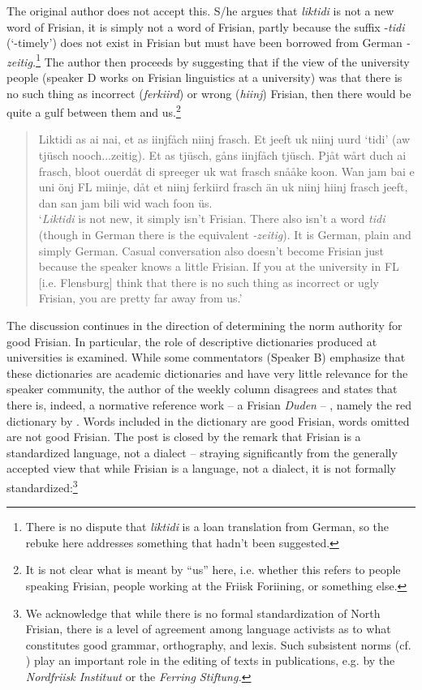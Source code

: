 \documentclass[output=paper]{langsci/langscibook}
\begin{document}
The original author does not accept this. S/he argues that \textit{liktidi} is not a new word of Frisian, it is simply not a word of Frisian, partly because the suffix -\textit{tidi} (‘-timely’) does not exist in Frisian but must have been borrowed from German \mbox{\textit{-zeitig.}}\footnote{There is no dispute that \textit{liktidi} is a loan translation from German, so the rebuke here addresses something that hadn’t been suggested.} The author then proceeds by suggesting that if the view of the university people (speaker D works on Frisian linguistics at a university) was that there is no such thing as incorrect (\textit{ferkiird}) or wrong (\textit{hiinj}) Frisian, then there would be quite a gulf between them and us.\footnote{It is not clear what is meant by “us” here, i.e. whether this refers to people speaking Frisian, people working at the Friisk Foriining, or something else.} 

\begin{quote}
Liktidi as ai nai, et as iinjfåch niinj frasch. Et jeeft uk niinj uurd ‘tidi’ (aw tjüsch nooch...zeitig). Et as tjüsch, gåns iinjfåch tjüsch. Pjåt wårt duch ai frasch, bloot ouerdåt di spreeger uk wat frasch snååke koon. Wan jam bai e uni önj FL miinje, dåt et niinj ferkiird frasch än uk niinj hiinj frasch jeeft, dan san jam bili wid wach foon üs.\smallskip\\\relax
‘\textit{Liktidi} is not new, it simply isn’t Frisian. There also isn’t a word \textit{tidi} (though in German there is the equivalent \textit{{}-zeitig}). It is German, plain and simply German. Casual conversation also doesn’t become Frisian just because the speaker knows a little Frisian. If you at the university in FL [i.e. Flensburg] think that there is no such thing as incorrect or ugly Frisian, you are pretty far away from us.’
\end{quote}

The discussion continues in the direction of determining the norm authority for good Frisian. In particular, the role of descriptive dictionaries produced at universities is examined. While some commentators (Speaker B) emphasize that these dictionaries are academic dictionaries and have very little relevance for the speaker community, the author of the weekly column disagrees and states that there is, indeed, a normative reference work – a Frisian \textit{Duden} – , namely the red dictionary by \citet{SjolinEtAl1988}. Words included in the dictionary are good Frisian, words omitted are not good Frisian. The post is closed by the remark that Frisian is a standardized language, not a dialect – straying significantly from the generally accepted view that while Frisian is a language, not a dialect, it is not formally standardized:\footnote{We acknowledge that while there is no formal standardization of North Frisian, there is a level of agreement among language activists as to what constitutes good grammar, orthography, and lexis. Such subsistent norms (cf. \citealt{Gloy1975}) play an important role in the editing of texts in publications, e.g. by the \textit{Nordfriisk Instituut} or the \textit{Ferring Stiftung.}}
\end{document}
